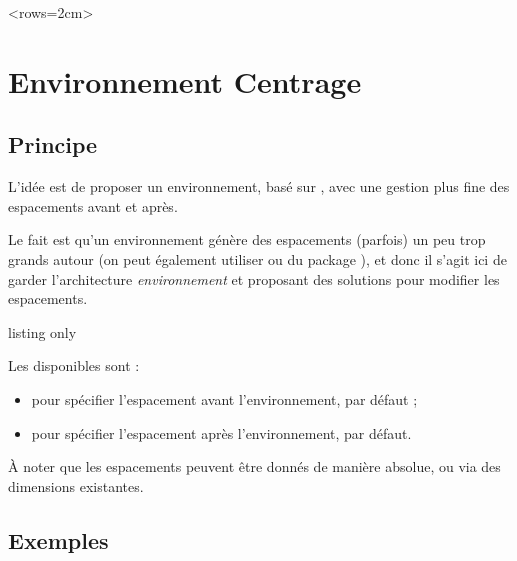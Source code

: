 \documentclass[french,11pt,a4paper]{article}
\begin{document}
\begin{DemoCode}{}
    <rows={2cm}>
\end{DemoCode}

\pagebreak

\section{Environnement Centrage}

\subsection{Principe}

L'idée est de proposer un environnement, basé sur , avec une gestion plus fine des espacements avant et après.

Le fait est qu'un environnement  génère des espacements (parfois) un peu trop grands autour (on peut également utiliser  ou  du package ), et donc il s'agit ici de garder l'architecture \textit{environnement} et proposant des solutions pour modifier les espacements.

\begin{DemoCode}{listing only}
\begin{Centrage}[options]
\end{Centrage}
\end{DemoCode}

Les  disponibles sont :

\begin{itemize}
	\item {} pour spécifier l'espacement avant l'environnement,  par défaut ;
	\item {} pour spécifier l'espacement après l'environnement,  par défaut.
\end{itemize}

À noter que les espacements peuvent être donnés de manière absolue, ou via des dimensions existantes.

\subsection{Exemples}
\end{document}
